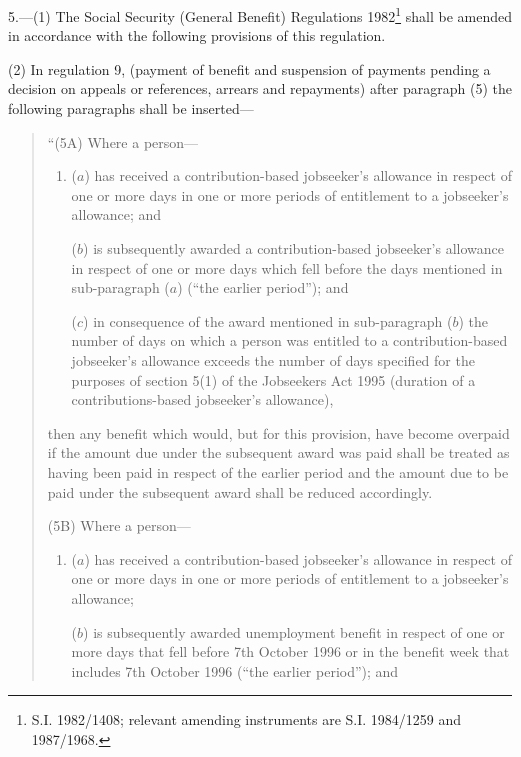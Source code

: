 \documentclass[12pt,a4paper]{article}
\begin{document}
\begin{sloppypar}
5.—(1) The Social Security (General Benefit) Regulations 1982\footnote{\frenchspacing S.I. 1982/1408; relevant amending instruments are S.I. 1984/1259 and 1987/1968.} shall be amended in accordance with the following provisions of this regulation.
\end{sloppypar}

(2) In regulation 9, (payment of benefit and suspension of payments pending a decision on appeals or references, arrears and repayments) after paragraph (5) the following paragraphs shall be inserted—
\begin{quotation}
“(5A) Where a person—
\begin{enumerate}\item[]
($a$) has received a contribution-based jobseeker’s allowance in respect of one or more days in one or more periods of entitlement to a jobseeker’s allowance; and

($b$) is subsequently awarded a contribution-based jobseeker’s allowance in respect of one or more days which fell before the days mentioned in sub-paragraph ($a$) (“the earlier period”); and

($c$) in consequence of the award mentioned in sub-paragraph ($b$) the number of days on which a person was entitled to a contribution-based jobseeker’s allowance exceeds the number of days specified for the purposes of section 5(1) of the Jobseekers Act 1995 (duration of a contributions-based jobseeker’s allowance),
\end{enumerate}
then any benefit which would, but for this provision, have become overpaid if the amount due under the subsequent award was paid shall be treated as having been paid in respect of the earlier period and the amount due to be paid under the subsequent award shall be reduced accordingly.

(5B) Where a person—
\begin{enumerate}\item[]
($a$) has received a contribution-based jobseeker’s allowance in respect of one or more days in one or more periods of entitlement to a jobseeker’s allowance;

($b$) is subsequently awarded unemployment benefit in respect of one or more days that fell before 7th October 1996 or in the benefit week that includes 7th October 1996 (“the earlier period”); and


\end{enumerate}
\end{quotation}
\end{document}

